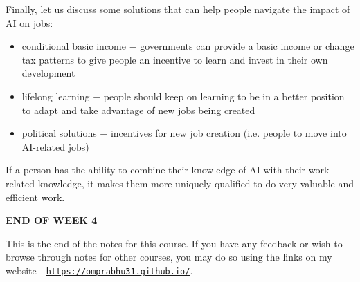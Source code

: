 \documentclass{article}[a4paper,12pt]
\theoremstyle{definition}
\begin{document}
Finally, let us discuss some solutions that can help people navigate the impact of AI on jobs:
\begin{itemize}
	\item conditional basic income $-$ governments can provide a basic income or change tax patterns to give people an incentive to learn and invest in their own development
	\item lifelong learning $-$ people should keep on learning to be in a better position to adapt and take advantage of new jobs being created
	\item political solutions $-$ incentives for new job creation (i.e. people to move into AI-related jobs)
\end{itemize}
If a person has the ability to combine their knowledge of AI with their work-related knowledge, it makes them more uniquely qualified to do very valuable and efficient work.

\hrulefill
\begin{center}
\textbf{END OF WEEK 4}
\end{center}
This is the end of the notes for this course. If you have any feedback or wish to browse through notes for other courses, you may do so using the links on my website - \texttt{\href{https://omprabhu31.github.io/}{https://omprabhu31.github.io/}}.

\hrulefill
\end{document}
